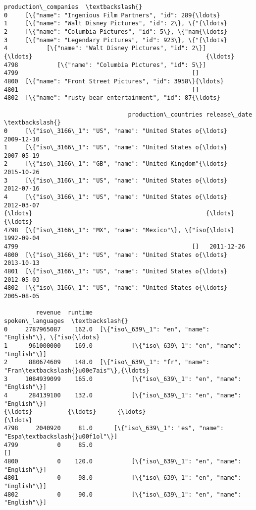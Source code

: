 \documentclass[11pt]{article}
\begin{document}
\begin{tcolorbox}[breakable, size=fbox, boxrule=.5pt, pad at break*=1mm, opacityfill=0]
\begin{Verbatim}[commandchars=\\\{\}]
                                   production\_companies  \textbackslash{}
0     [\{"name": "Ingenious Film Partners", "id": 289{\ldots}
1     [\{"name": "Walt Disney Pictures", "id": 2\}, \{"{\ldots}
2     [\{"name": "Columbia Pictures", "id": 5\}, \{"nam{\ldots}
3     [\{"name": "Legendary Pictures", "id": 923\}, \{"{\ldots}
4           [\{"name": "Walt Disney Pictures", "id": 2\}]
{\ldots}                                                 {\ldots}
4798           [\{"name": "Columbia Pictures", "id": 5\}]
4799                                                 []
4800  [\{"name": "Front Street Pictures", "id": 3958\}{\ldots}
4801                                                 []
4802  [\{"name": "rusty bear entertainment", "id": 87{\ldots}

                                   production\_countries release\_date  \textbackslash{}
0     [\{"iso\_3166\_1": "US", "name": "United States o{\ldots}   2009-12-10
1     [\{"iso\_3166\_1": "US", "name": "United States o{\ldots}   2007-05-19
2     [\{"iso\_3166\_1": "GB", "name": "United Kingdom"{\ldots}   2015-10-26
3     [\{"iso\_3166\_1": "US", "name": "United States o{\ldots}   2012-07-16
4     [\{"iso\_3166\_1": "US", "name": "United States o{\ldots}   2012-03-07
{\ldots}                                                 {\ldots}          {\ldots}
4798  [\{"iso\_3166\_1": "MX", "name": "Mexico"\}, \{"iso{\ldots}   1992-09-04
4799                                                 []   2011-12-26
4800  [\{"iso\_3166\_1": "US", "name": "United States o{\ldots}   2013-10-13
4801  [\{"iso\_3166\_1": "US", "name": "United States o{\ldots}   2012-05-03
4802  [\{"iso\_3166\_1": "US", "name": "United States o{\ldots}   2005-08-05

         revenue  runtime                                   spoken\_languages  \textbackslash{}
0     2787965087    162.0  [\{"iso\_639\_1": "en", "name": "English"\}, \{"iso{\ldots}
1      961000000    169.0           [\{"iso\_639\_1": "en", "name": "English"\}]
2      880674609    148.0  [\{"iso\_639\_1": "fr", "name": "Fran\textbackslash{}u00e7ais"\},{\ldots}
3     1084939099    165.0           [\{"iso\_639\_1": "en", "name": "English"\}]
4      284139100    132.0           [\{"iso\_639\_1": "en", "name": "English"\}]
{\ldots}          {\ldots}      {\ldots}                                                {\ldots}
4798     2040920     81.0      [\{"iso\_639\_1": "es", "name": "Espa\textbackslash{}u00f1ol"\}]
4799           0     85.0                                                 []
4800           0    120.0           [\{"iso\_639\_1": "en", "name": "English"\}]
4801           0     98.0           [\{"iso\_639\_1": "en", "name": "English"\}]
4802           0     90.0           [\{"iso\_639\_1": "en", "name": "English"\}]


\end{Verbatim}
\end{tcolorbox}
\end{document}
